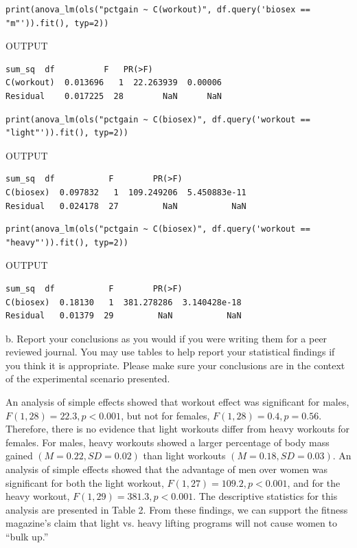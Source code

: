 \documentclass[onecolumn,10pt]{jhwhw}
\begin{document}
\begin{lstlisting}
print(anova_lm(ols("pctgain ~ C(workout)", df.query('biosex == "m"')).fit(), typ=2))
\end{lstlisting}
\noindent OUTPUT
\begin{lstlisting}[language={}]
              sum_sq  df          F   PR(>F)
C(workout)  0.013696   1  22.263939  0.00006
Residual    0.017225  28        NaN      NaN
\end{lstlisting}

\begin{lstlisting}
print(anova_lm(ols("pctgain ~ C(biosex)", df.query('workout == "light"')).fit(), typ=2))
\end{lstlisting}
\noindent OUTPUT
\begin{lstlisting}[language={}]
             sum_sq  df           F        PR(>F)
C(biosex)  0.097832   1  109.249206  5.450883e-11
Residual   0.024178  27         NaN           NaN
\end{lstlisting}

\begin{lstlisting}
print(anova_lm(ols("pctgain ~ C(biosex)", df.query('workout == "heavy"')).fit(), typ=2))
\end{lstlisting}
\noindent OUTPUT
\begin{lstlisting}[language={}]
            sum_sq  df           F        PR(>F)
C(biosex)  0.18130   1  381.278286  3.140428e-18
Residual   0.01379  29         NaN           NaN
\end{lstlisting}

b. Report your conclusions as you would if you were writing them for a peer reviewed journal. You may use tables to help report your statistical findings if you think it is appropriate. Please make sure your conclusions are in the context of the experimental scenario presented.

An analysis of simple effects showed that workout effect was significant for males, $F(1, 28) = 22.3, p < 0.001$, but not for females, $F(1, 28) = 0.4, p = 0.56$. Therefore, there is no evidence that light workouts differ from heavy workouts for females. For males, heavy workouts showed a larger percentage of body mass gained $(M=0.22, SD=0.02)$ than light workouts $(M=0.18, SD=0.03)$. An analysis of simple effects showed that the advantage of men over women was significant for both the light workout, $F(1, 27) = 109.2, p < 0.001$, and for the heavy workout, $F(1, 29) = 381.3, p < 0.001$. The descriptive statistics for this analysis are presented in Table 2. From these findings, we can support the fitness magazine's claim that light vs. heavy lifting programs will not cause women to ``bulk up.''
\end{document}
